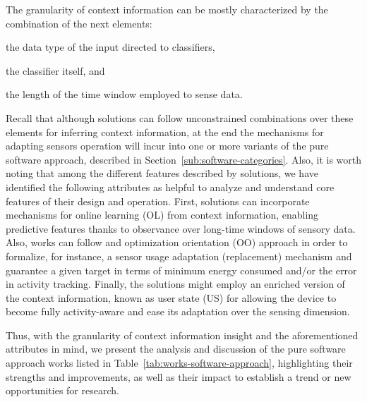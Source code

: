 \documentclass[ENG,PhD]{cinvestav}
\begin{document}
The granularity of context information can be mostly characterized by the combination of the next elements: 
\begin{listahorizontal}
  \item the data type of the input directed to classifiers,
  \item the classifier itself, and
  \item the length of the time window employed to sense data.
\end{listahorizontal}
Recall that although solutions can follow unconstrained combinations over these elements for inferring context information, at the end the mechanisms for adapting sensors operation will incur into one or more variants of the pure software approach, described in Section~\ref{sub:software-categories}.
Also, it is worth noting that among the different features described by solutions, we have identified the following attributes as helpful to analyze and understand core features of their design and operation.
First, solutions can incorporate mechanisms for online learning (OL) from context information, enabling predictive features thanks to observance over long-time windows of sensory data.
Also, works can follow and optimization orientation (OO) approach in order to formalize, for instance, a sensor usage adaptation (replacement) mechanism and guarantee a given target in terms of minimum energy consumed and/or the error in activity tracking.
Finally, the solutions might employ an enriched version of the context information, known as user state (US) for allowing the device to become fully activity-aware and ease its adaptation over the sensing dimension.

Thus, with the granularity of context information insight and the aforementioned attributes in mind, we present the analysis and discussion of the pure software approach works listed in Table~\ref{tab:works-software-approach}, highlighting their strengths and improvements, as well as their impact to establish a trend or new opportunities for research.



\end{document}

